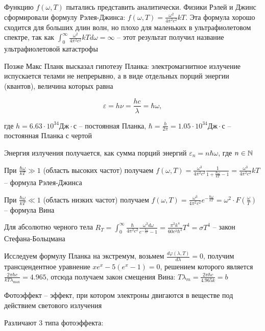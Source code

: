 \documentclass[12pt]{article}
\begin{document}
Функцию $f(\omega, T)$ пытались представить аналитически. Физики Рэлей и Джинс сформировали формулу Рэлея-Джинса: $f(\omega, T) = \frac{\omega^2}{4\pi^2 c^2} kT$. Эта формула хорошо сходится для больших длин волн, но плохо для маленьких в ультрафиолетовом спектре, так как $\int_0^\infty \frac{\omega^2}{4\pi^2 c^2} kT d\omega = \infty$ -- этот результат получил название ультрафиолетовой катастрофы

Позже Макс Планк высказал гипотезу Планка: электромагнитное излучение испускается телами не непрерывно, а в виде отдельных порций энергии (квантов), величина которых равна 

\[\varepsilon = h \nu = \frac{h c}{\lambda} = \hbar \omega,\]

где $h = 6.63 \cdot 10^{34} \text{Дж}\cdot\text{с}$ -- постоянная Планка, $\hbar = \frac{h}{2\pi} = 1.05 \cdot 10^{34} \text{Дж}\cdot\text{с}$ -- постоянная Планка с чертой

Энергия излучения получается, как сумма порций энергий $\varepsilon_n = n \hbar \omega$, где $n \in \mathbb{N}$

При $\frac{\hbar \omega}{kT} \gg 1$ (область высоких частот) получаем $f(\omega, T) = \frac{\omega^3}{4\pi^2 c^2} \frac{1}{1 + \frac{\hbar \omega}{kT} - 1} = \frac{\omega^3}{4\pi^2 c^2} kT$ -- формула Рэлея-Джинса

При $\frac{\hbar \omega}{kT} \ll 1$ (область низких частот) получаем $f(\omega, T) = \frac{\omega^3}{4\pi^2 c^2} e^{-\frac{\hbar \omega}{k T}} = \omega^2 \cdot F\left(\frac{\omega}{T}\right)$ -- формула Вина

Для абсолютно черного тела $R_T = \int_0^\infty \frac{\hbar}{4\pi^2 c^2} \frac{\omega^3 d\omega}{e^{-\frac{\hbar \omega}{k T}} - 1} = \frac{\pi^2 k^4}{60 c^2 \hbar^3} T^4 = \sigma T^4$ -- закон Стефана-Больцмана

\smallvspace 

Исследуем формулу Планка на экстремум, возьмем $\frac{d \varphi(\lambda, T)}{d\lambda} = 0$, получим трансцендентное уравнение $x e^x - 5(e^x - 1) = 0$, решением которого является $\frac{2\pi \hbar c}{k T \lambda_{\max}} = 4.965$, отсюда получаем закон смещения Вина: $T \lambda_m = \frac{2\pi \hbar c}{4.965 k} = b$

\bigvspace

Фотоэффект -- эффект, при котором электроны двигаются в веществе под действием светового излучения

Различают 3 типа фотоэффекта:
\end{document}
